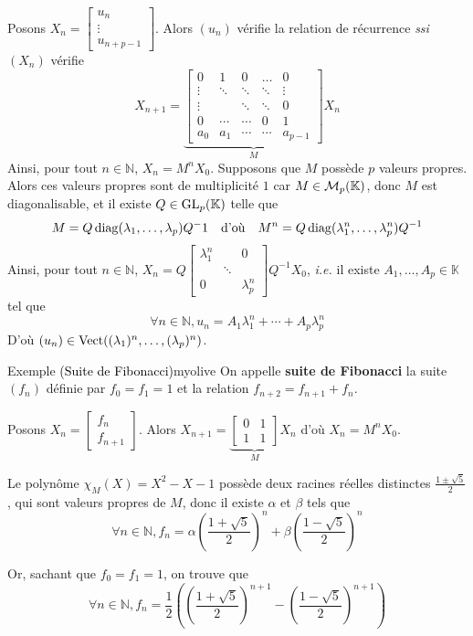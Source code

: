     Posons $X_n = \begin{bmatrix}
        u_n \\
        \vdots \\
        u_{n + p-1}
    \end{bmatrix}$. Alors $(u_n)$ vérifie la relation de récurrence \textit{ssi} $(X_n)$ vérifie 
    \[ X_{n + 1} = \underbrace{\begin{bmatrix}
        0 & 1 & 0 & \ldots & 0 \\
        \vdots & \ddots & \ddots & \ddots & \vdots \\
        \vdots & & \ddots & \ddots & 0 \\
        0 & \cdots & \cdots & 0 &  1 \\
        a_0 & a_1 & \cdots & \cdots & a_{p-1}
    \end{bmatrix}}_{M} X_n \]  
    Ainsi, pour tout  $n \in \mathbb{N}$, $X_n = M^n X_0$. Supposons que $M$ possède $p$ valeurs propres. Alors ces valeurs propres sont de multiplicité $1$ car $M \in \mathcal{M}_{p}(\mathbb{K})$, donc $M$ est diagonalisable, et il existe $Q \in \operatorname{GL}_p(\mathbb{K})$ telle que 
    \[ M = Q \operatorname{diag}(\lambda_1,\ldots,\lambda_p)Q^-1 \quad \text{d’où} \quad M^n = Q \operatorname{diag}(\lambda_1^n, \ldots, \lambda_p^n) Q^{-1} \] 
    Ainsi, pour tout $n \in \mathbb{N}$, $X_n = Q \begin{bmatrix}
        \lambda_1^n & & 0 \\
        & \ddots & \\
        0 & & \lambda_p^n
    \end{bmatrix} Q^{-1} X_0$, \textit{i.e.} il existe $A_1,\ldots,A_p \in \mathbb{K}$ tel que 
    \[ \forall n \in \mathbb{N}, u_n = A_1 \lambda_1^n + \cdots + A_p \lambda_p^n \]   
    D’où $(u_n) \in \operatorname{Vect}((\lambda_1)^n, \ldots, (\lambda_p)^n)$.

    \begin{omed}{Exemple \textcolor{black}{(Suite de Fibonacci)}}{myolive}
        On appelle \textbf{suite de Fibonacci} la suite $(f_n)$ définie par $f_0 = f_1 = 1$ et la relation $f_{n+2} = f_{n+1} + f_n$. 

        Posons $X_n = \begin{bmatrix}
            f_n \\
            f_{n+1}
        \end{bmatrix}$. Alors $X_{n+1} = \underbrace{\begin{bmatrix}
            0 & 1 \\
            1 & 1
        \end{bmatrix}}_M X_n$ d’où $X_n = M^n X_0$.

        Le polynôme $\chi_M(X) = X^2 - X - 1$ possède deux racines réelles distinctes $\frac{1 \pm \sqrt{5}}{2}$, qui sont valeurs propres de $M$, donc il existe $\alpha$ et $\beta$ tels que 
        \[ \forall n \in \mathbb{N}, f_n = \alpha \left( \frac{1 + \sqrt{5}}{2} \right)^n + \beta \left( \frac{1-\sqrt{5}}{2} \right)^n \]
        
        Or, sachant que $f_0 = f_1 = 1$, on trouve que 
        \[ \forall n \in \mathbb{N}, f_n = \frac{1}{2} \left( \left( \frac{1 + \sqrt{5}}{2} \right)^{n+1} - \left( \frac{1-\sqrt{5}}{2} \right)^{n+1}  \right) \]
    \end{omed}

